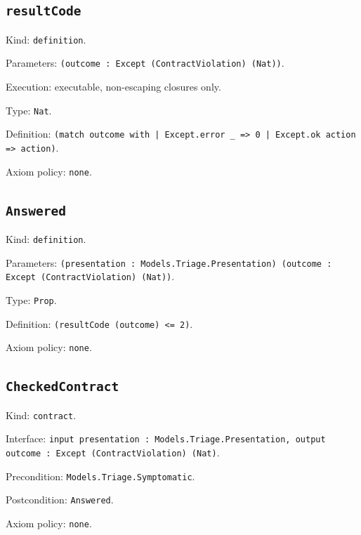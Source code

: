 \documentclass[11pt]{article}
\begin{document}
\subsection*{\texttt{resultCode}}
\noindent Kind: \texttt{definition}.\par
\noindent Parameters: \texttt{(outcome : Except (ContractViolation) (Nat))}.\par
\noindent Execution: executable, non-escaping closures only.\par
\noindent Type: \texttt{Nat}.\par
\noindent Definition: \texttt{(match outcome with | Except.error \_ => 0 | Except.ok action => action)}.\par
\noindent Axiom policy: \texttt{none}.\par
\subsection*{\texttt{Answered}}
\noindent Kind: \texttt{definition}.\par
\noindent Parameters: \texttt{(presentation : Models.Triage.Presentation) (outcome : Except (ContractViolation) (Nat))}.\par
\noindent Type: \texttt{Prop}.\par
\noindent Definition: \texttt{(resultCode (outcome) <= 2)}.\par
\noindent Axiom policy: \texttt{none}.\par
\subsection*{\texttt{CheckedContract}}
\noindent Kind: \texttt{contract}.\par
\noindent Interface: \texttt{input presentation : Models.Triage.Presentation, output outcome : Except (ContractViolation) (Nat)}.\par
\noindent Precondition: \texttt{Models.Triage.Symptomatic}.\par
\noindent Postcondition: \texttt{Answered}.\par
\noindent Axiom policy: \texttt{none}.\par
\end{document}
